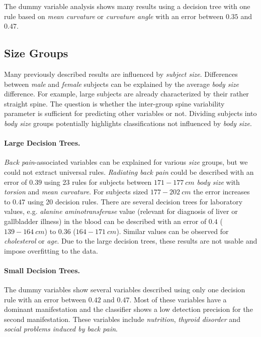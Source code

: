 \documentclass[a4paper,twoside]{style/article}
\begin{document}
The dummy variable analysis shows many results using a decision tree with one rule based on \emph{mean curvature} or \emph{curvature angle} with an error between $0.35$ and $0.47$.
\subsection{Size Groups}
Many previously described results are influenced by \emph{subject size}.
Differences between \emph{male} and \emph{female} subjects can be explained by the average \emph{body size} difference.
For example, large subjects are already characterized by their rather straight spine.
%
The question is whether the inter-group spine variability parameter is sufficient for predicting other variables or not.
Dividing subjects into \emph{body size} groups potentially highlights classifications not influenced by \emph{body size}.
\paragraph{Large Decision Trees. }
\emph{Back pain}-associated variables can be explained for various \emph{size} groups, but we could not extract universal rules.
\emph{Radiating back pain} could be described with an error of $0.39$ using 23 rules for subjects between \emph{$171-177~cm$ body size} with \emph{torsion} and \emph{mean curvature}.
For subjects sized \emph{$177-202~cm$} the error increases to $0.47$ using 20 decision rules.
There are several decision trees for laboratory values, e.g. \emph{alanine aminotransferase} value (relevant for diagnosis of liver or gallbladder illness) in the blood can be described with an error of $0.4$ (\emph{$139-164~cm$}) to $0.36$ (\emph{$164 - 171~cm$}).
Similar values can be observed for \emph{cholesterol} or \emph{age}.
Due to the large decision trees, these results are not usable and impose overfitting to the data.
\paragraph{Small Decision Trees. }
The dummy variables show several variables described using only one decision rule with an error between $0.42$ and $0.47$.
Most of these variables have a dominant manifestation and the classifier shows a low detection precision for the second manifestation.
These variables include \emph{nutrition}, \emph{thyroid disorder} and \emph{social problems induced by back pain}.
\end{document}
